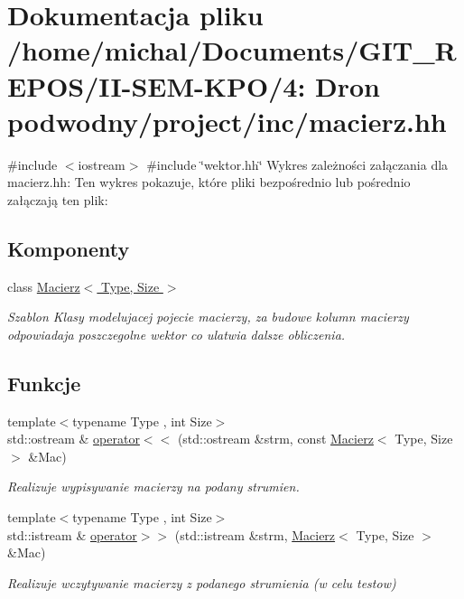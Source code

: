 \hypertarget{macierz_8hh}{}\section{Dokumentacja pliku /home/michal/\+Documents/\+G\+I\+T\+\_\+\+R\+E\+P\+O\+S/\+I\+I-\/\+S\+E\+M-\/\+K\+P\+O/4\+: Dron podwodny/project/inc/macierz.hh}
\label{macierz_8hh}
{\ttfamily \#include $<$iostream$>$}\newline
{\ttfamily \#include \char`\"{}wektor.\+hh\char`\"{}}\newline
Wykres zależności załączania dla macierz.\+hh\+:
Ten wykres pokazuje, które pliki bezpośrednio lub pośrednio załączają ten plik\+:
\subsection*{Komponenty}
\begin{DoxyCompactItemize}
\item 
class \hyperlink{class_macierz}{Macierz$<$ Type, Size $>$}
\begin{DoxyCompactList}\small\item\em Szablon Klasy modelujacej pojecie macierzy, za budowe kolumn macierzy odpowiadaja poszczegolne wektor co ulatwia dalsze obliczenia. \end{DoxyCompactList}\end{DoxyCompactItemize}
\subsection*{Funkcje}
\begin{DoxyCompactItemize}
\item 
{\footnotesize template$<$typename Type , int Size$>$ }\\std\+::ostream \& \hyperlink{macierz_8hh_a499afed56441e17daf178ebf5d524e33}{operator$<$$<$} (std\+::ostream \&strm, const \hyperlink{class_macierz}{Macierz}$<$ Type, Size $>$ \&Mac)
\begin{DoxyCompactList}\small\item\em Realizuje wypisywanie macierzy na podany strumien. \end{DoxyCompactList}\item 
{\footnotesize template$<$typename Type , int Size$>$ }\\std\+::istream \& \hyperlink{macierz_8hh_a863ba607b06f11aeb6b87fa77a768eb7}{operator$>$$>$} (std\+::istream \&strm, \hyperlink{class_macierz}{Macierz}$<$ Type, Size $>$ \&Mac)
\begin{DoxyCompactList}\small\item\em Realizuje wczytywanie macierzy z podanego strumienia (w celu testow) \end{DoxyCompactList}\end{DoxyCompactItemize}


